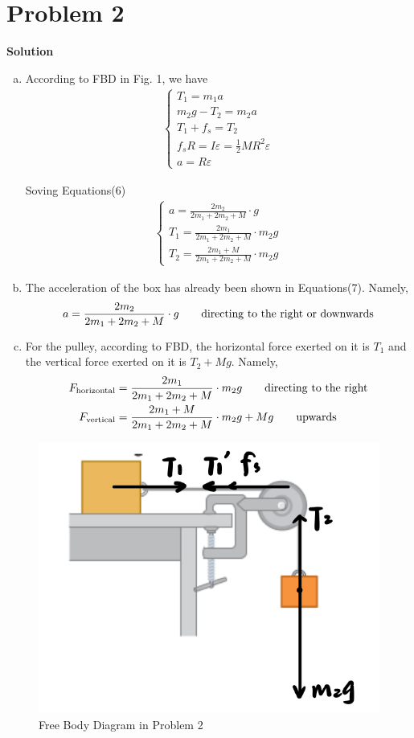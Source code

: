 \documentclass[12pt,a4paper]{article}
\begin{document}
\section*{\large \textbf{Problem 2}}
{\textbf{Solution}}

\begin{enumerate}[(a)]

\item According to FBD in Fig. 1, we have
\begin{align}
	\left\{
		\begin{array}{l}
			T_1 = m_1 a\\
			m_2g - T_2 = m_2 a\\
			T_1 + f_s = T_2\\
			f_s R = I\varepsilon = \frac{1}{2}MR^2\varepsilon\\
			a = R\varepsilon
		\end{array}
	\right.
\end{align}

Soving Equations(6)
\begin{align}
	\left\{
	\begin{array}{l}
		a = \frac{2m_2}{2m_1+2m_2+M}\cdot g\\
		T_1 = \frac{2m_1}{2m_1+2m_2+M}\cdot m_2g\\
		T_2 = \frac{2m_1+M}{2m_1+2m_2+M}\cdot m_2g
	\end{array}
	\right.
\end{align}

\item The acceleration of the box has already been shown in Equations(7). Namely,
$$
	a = \frac{2m_2}{2m_1+2m_2+M}\cdot g \qquad {\rm directing\ to\ the\ right\ or\ downwards}
$$

\item For the pulley, according to FBD, the horizontal force exerted on it is $T_1$ and the vertical force exerted on it is $T_2 + Mg$. Namely,
\begin{align}
	F_{\rm horizontal} &= \frac{2m_1}{2m_1+2m_2+M}\cdot m_2g \qquad {\rm directing\ to\ the\ right}\\
	F_{\rm vertical} &= \frac{2m_1+M}{2m_1+2m_2+M}\cdot m_2g + Mg \qquad {\rm upwards}
\end{align}

\end{enumerate}

\begin{figure}[!htbp] 
\centering 
\includegraphics[width=0.4\linewidth]{FDR1.png}  
\caption{Free Body Diagram in Problem 2} 
\end{figure}
\end{document}
